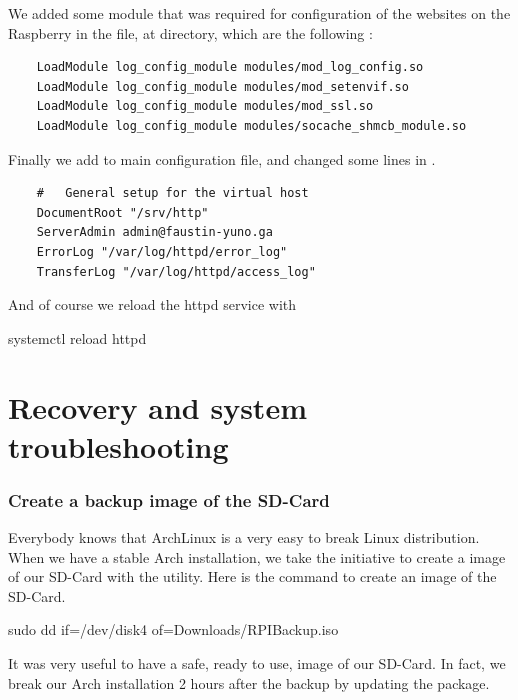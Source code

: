 \documentclass[11pt]{article}
\begin{document}
We added some module that was required for configuration of the websites on the Raspberry in the  file, at  directory, which are the following :

\begin{verbatim}
    LoadModule log_config_module modules/mod_log_config.so
    LoadModule log_config_module modules/mod_setenvif.so
    LoadModule log_config_module modules/mod_ssl.so
    LoadModule log_config_module modules/socache_shmcb_module.so
\end{verbatim}

Finally we add  to main configuration file, and changed some lines in .

\begin{verbatim}
    #   General setup for the virtual host
    DocumentRoot "/srv/http"
    ServerAdmin admin@faustin-yuno.ga
    ErrorLog "/var/log/httpd/error_log"
    TransferLog "/var/log/httpd/access_log"
\end{verbatim}

And of course we reload the httpd service with

\begin{bash}
    systemctl reload httpd    
\end{bash}

\part{Recovery and system troubleshooting}
\setcounter{section}{0}
\section{Create a backup image of the SD-Card}

Everybody knows that ArchLinux is a very easy to break Linux distribution. When we have a stable Arch installation, we take the initiative to create a image of our SD-Card with the  utility. Here is the command to create an image of the SD-Card.

\begin{bash}
    sudo dd if=/dev/disk4 of=Downloads/RPIBackup.iso
\end{bash}

It was very useful to have a safe, ready to use, image of our SD-Card. In fact, we break our Arch installation 2 hours after the backup by updating the  package.
\end{document}
